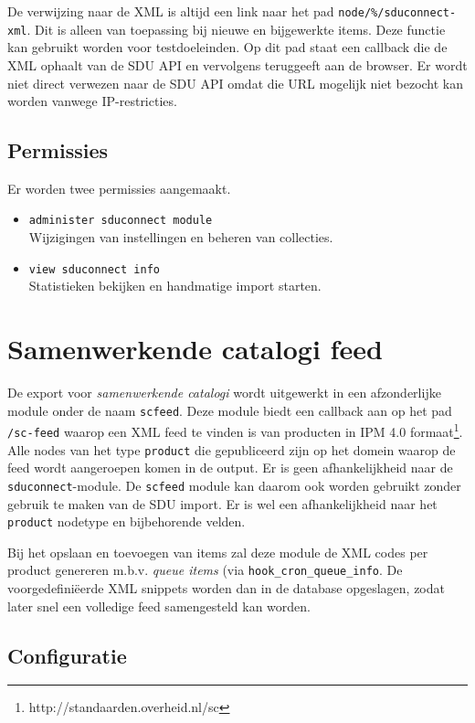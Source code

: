 \documentclass[12pt]{article}
\begin{document}
De verwijzing naar de XML is altijd een link naar het pad \texttt{node/\%/sduconnect-xml}. Dit is alleen van toepassing bij nieuwe en bijgewerkte items. Deze functie kan gebruikt worden voor testdoeleinden. Op dit pad staat een callback die de XML ophaalt van de SDU API en vervolgens teruggeeft aan de browser. Er wordt niet direct verwezen naar de SDU API omdat die URL mogelijk niet bezocht kan worden vanwege IP-restricties.

\subsection{Permissies}

Er worden twee permissies aangemaakt.

\begin{itemize}
\item \texttt{administer sduconnect module} \\
  Wijzigingen van instellingen en beheren van collecties.
\item \texttt{view sduconnect info} \\
  Statistieken bekijken en handmatige import starten.
\end{itemize}

\clearpage
\section{Samenwerkende catalogi feed}

De export voor \emph{samenwerkende catalogi} wordt uitgewerkt in een afzonderlijke module onder de naam \texttt{scfeed}. Deze module biedt een callback aan op het pad \texttt{/sc-feed} waarop een XML feed te vinden is van producten in IPM 4.0 formaat\footnote{http://standaarden.overheid.nl/sc}. Alle nodes van het type \texttt{product} die gepubliceerd zijn op het domein waarop de feed wordt aangeroepen komen in de output.
Er is geen afhankelijkheid naar de \texttt{sduconnect}-module. De \texttt{scfeed} module kan daarom ook worden gebruikt zonder gebruik te maken van de SDU import. Er is wel een afhankelijkheid naar het \texttt{product} nodetype en bijbehorende velden.

Bij het opslaan en toevoegen van items zal deze module de XML codes per product genereren m.b.v. \emph{queue items} (via \texttt{hook\_cron\_queue\_info}. De voorgedefini\"{e}erde XML snippets worden dan in de database opgeslagen, zodat later snel een volledige feed samengesteld kan worden.

\subsection{Configuratie}
\end{document}
